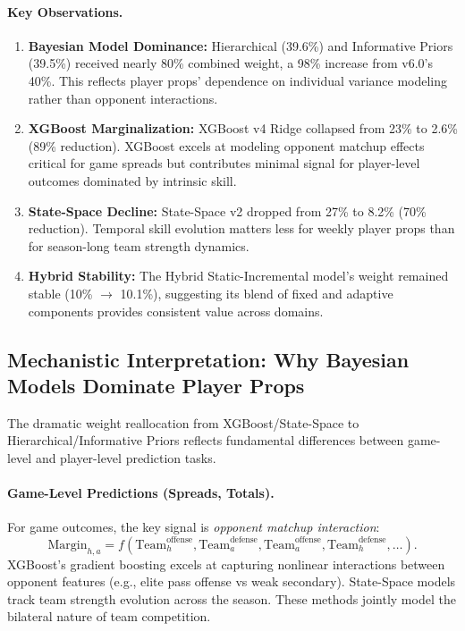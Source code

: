\paragraph{Key Observations.}
\begin{enumerate}
\item \textbf{Bayesian Model Dominance:} Hierarchical (39.6\%) and Informative Priors (39.5\%) received nearly 80\% combined weight, a 98\% increase from v6.0's 40\%. This reflects player props' dependence on individual variance modeling rather than opponent interactions.

\item \textbf{XGBoost Marginalization:} XGBoost v4 Ridge collapsed from 23\% to 2.6\% (89\% reduction). XGBoost excels at modeling opponent matchup effects critical for game spreads but contributes minimal signal for player-level outcomes dominated by intrinsic skill.

\item \textbf{State-Space Decline:} State-Space v2 dropped from 27\% to 8.2\% (70\% reduction). Temporal skill evolution matters less for weekly player props than for season-long team strength dynamics.

\item \textbf{Hybrid Stability:} The Hybrid Static-Incremental model's weight remained stable (10\% $\to$ 10.1\%), suggesting its blend of fixed and adaptive components provides consistent value across domains.
\end{enumerate}

\subsection{Mechanistic Interpretation: Why Bayesian Models Dominate Player Props}
\label{subsec:mechanistic-interpretation}

The dramatic weight reallocation from XGBoost/State-Space to Hierarchical/Informative Priors reflects fundamental differences between game-level and player-level prediction tasks.

\paragraph{Game-Level Predictions (Spreads, Totals).}
For game outcomes, the key signal is \emph{opponent matchup interaction}:
\begin{equation}
\text{Margin}_{h,a} = f(\text{Team}_h^{\text{offense}}, \text{Team}_a^{\text{defense}}, \text{Team}_a^{\text{offense}}, \text{Team}_h^{\text{defense}}, \ldots).
\end{equation}
XGBoost's gradient boosting excels at capturing nonlinear interactions between opponent features (e.g., elite pass offense vs weak secondary). State-Space models track team strength evolution across the season. These methods jointly model the bilateral nature of team competition.

